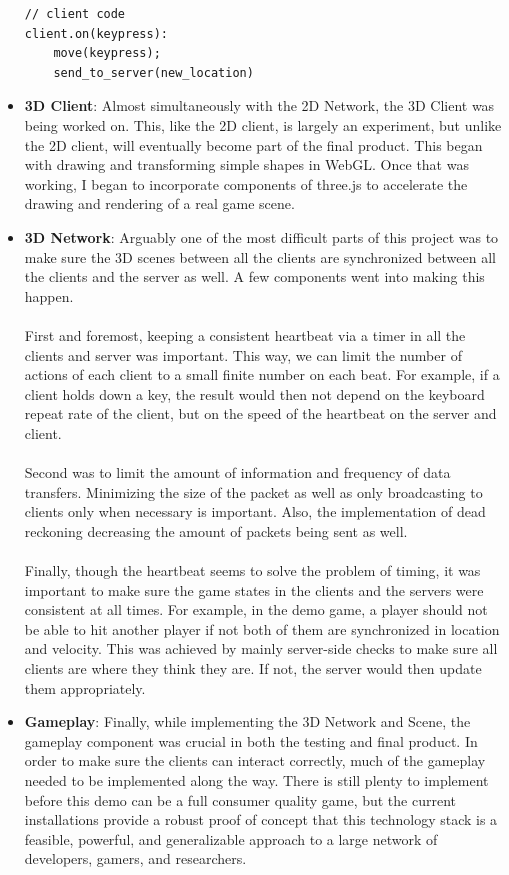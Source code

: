 \documentclass{acmsiggraph}
\begin{document}
\begin{itemize}
{\begin{verbatim}
// client code
client.on(keypress):
    move(keypress);
    send_to_server(new_location)
\end{verbatim}
        }
    \item{\textbf{3D Client}: Almost simultaneously with the 2D Network, the 3D Client was being worked on. This, like the 2D client, is largely an experiment, but unlike the 2D client, will eventually become part of the final product. This began with drawing and transforming simple shapes in WebGL. Once that was working, I began to incorporate components of three.js to accelerate the drawing and rendering of a real game scene.}
    \item{\textbf{3D Network}: Arguably one of the most difficult parts of this project was to make sure the 3D scenes between all the clients are synchronized between all the clients and the server as well. A few components went into making this happen.\\\\First and foremost, keeping a consistent heartbeat via a timer in all the clients and server was important. This way, we can limit the number of actions of each client to a small finite number on each beat. For example, if a client holds down a key, the result would then not depend on the keyboard repeat rate of the client, but on the speed of the heartbeat on the server and client.\\\\Second was to limit the amount of information and frequency of data transfers. Minimizing the size of the packet as well as only broadcasting to clients only when necessary is important. Also, the implementation of dead reckoning decreasing the amount of packets being sent as well.\\\\Finally, though the heartbeat seems to solve the problem of timing, it was important to make sure the game states in the clients and the servers were consistent at all times. For example, in the demo game, a player should not be able to hit another player if not both of them are synchronized in location and velocity. This was achieved by mainly server-side checks to make sure all clients are where they think they are. If not, the server would then update them appropriately.}
    \item{\textbf{Gameplay}: Finally, while implementing the 3D Network and Scene, the gameplay component was crucial in both the testing and final product. In order to make sure the clients can interact correctly, much of the gameplay needed to be implemented along the way. There is still plenty to implement before this demo can be a full consumer quality game, but the current installations provide a robust proof of concept that this technology stack is a feasible, powerful, and generalizable approach to a large network of developers, gamers, and researchers.}

\end{itemize}
\end{document}
